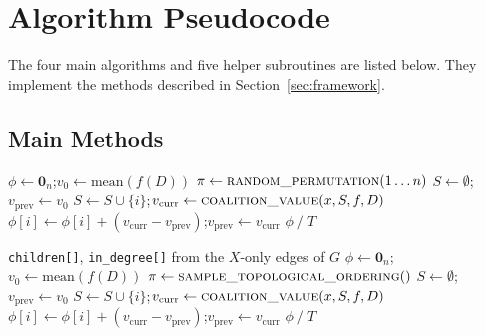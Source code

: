 \documentclass[12pt,letterpaper,twocolumn]{article}
\begin{document}
\section{Algorithm Pseudocode}
\label{app:algorithms}

The four main algorithms and five helper subroutines are listed below. They implement
the methods described in Section~\ref{sec:framework}.

\subsection{Main Methods}

\begin{algorithm}[H]
  \caption{Traditional Shapley (Monte Carlo)}
  \label{alg:traditional}
  \begin{algorithmic}[1]
    \State $\phi \gets \mathbf{0}_n$;\quad $v_0 \gets \text{mean}(f(D))$
      \State $\pi \gets \textsc{random\_permutation}(1 \ldots n)$
      \State $S \gets \emptyset$;\quad $v_{\text{prev}} \gets v_0$
        \State $S \gets S \cup \{i\}$;\quad $v_{\text{curr}} \gets \textsc{coalition\_value}(x, S, f, D)$
        \State $\phi[i] \gets \phi[i] + (v_{\text{curr}} - v_{\text{prev}})$;\quad $v_{\text{prev}} \gets v_{\text{curr}}$
      \EndFor
    \EndFor
    \Return $\phi \mathbin{/} T$
  \end{algorithmic}
\end{algorithm}

\begin{algorithm}[H]
  \caption{Asymmetric Shapley}
  \label{alg:asymmetric}
  \begin{algorithmic}[1]
    \PRECOMPUTE \texttt{children[]}, \texttt{in\_degree[]} from the $X$-only edges of $G$
    \State $\phi \gets \mathbf{0}_n$;\quad $v_0 \gets \text{mean}(f(D))$
      \State $\pi \gets \textsc{sample\_topological\_ordering}()$
      \State $S \gets \emptyset$;\quad $v_{\text{prev}} \gets v_0$
        \State $S \gets S \cup \{i\}$;\quad $v_{\text{curr}} \gets \textsc{coalition\_value}(x, S, f, D)$
        \State $\phi[i] \gets \phi[i] + (v_{\text{curr}} - v_{\text{prev}})$;\quad $v_{\text{prev}} \gets v_{\text{curr}}$
      \EndFor
    \EndFor
    \Return $\phi \mathbin{/} T$
  \end{algorithmic}
\end{algorithm}
\end{document}
